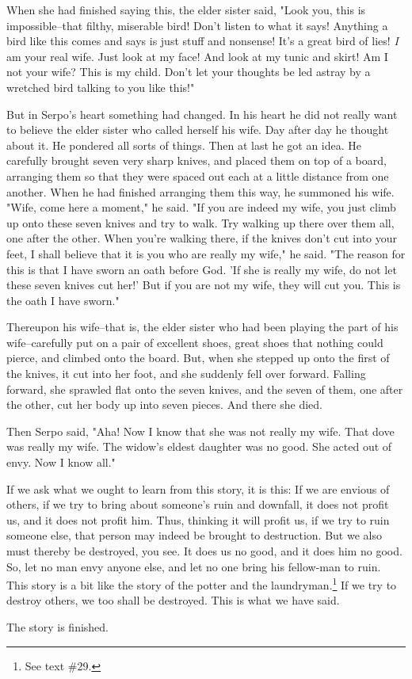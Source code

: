 When she had finished saying this, the elder sister said, "Look you, this
is impossible--that filthy, miserable bird! Don't listen to what it says! Anything
a bird like this comes and says is just stuff and nonsense! It's a great bird of
lies! \textit{I} am your real wife. Just look at my face! And look at my tunic
and skirt! Am I not your wife? This is my child. Don't let your thoughts be led
astray by a wretched bird talking to you like this!"

But in Serpo's heart something had changed. In his heart he did not really want
to believe the elder sister who called herself his wife. Day after day he thought
about it. He pondered all sorts of things. Then at last he got an idea. He carefully
brought seven very sharp knives, and placed them on top of a board, arranging them
so that they were spaced out each at a little distance from one another. When he
had finished arranging them this way, he summoned his wife. "Wife, come
here a moment," he said. "If you are indeed my wife, you just
climb up onto these seven knives and try to walk. Try walking up there over them
all, one after the other. When you're walking there, if the knives don't cut into
your feet, I shall believe that it is you who are really my wife," he
said. "The reason for this is that I have sworn an oath before God. 'If
she is really my wife, do not let these seven knives cut her!' But if you are not
my wife, they will cut you. This is the oath I have sworn."

Thereupon his wife--that is, the elder sister who had been playing the part of
his wife--carefully put on a pair of excellent shoes, great shoes that nothing
could pierce, and climbed onto the board. But, when she stepped up onto the first
of the knives, it cut into her foot, and she suddenly fell over forward. Falling
forward, she sprawled flat onto the seven knives, and the seven of them, one after
the other, cut her body up into seven pieces. And there she died.

Then Serpo said, "Aha! Now I know that she was not really my wife. That
dove was really my wife. The widow's eldest daughter was no good. She acted out
of envy. Now I know all."

If we ask what we ought to learn from this story, it is this: If we are envious
of others, if we try to bring about someone's ruin and downfall, it does not profit
us, and it does not profit him. Thus, thinking it will profit us, if we try to
ruin someone else, that person may indeed be brought to destruction. But we also
must thereby be destroyed, you see. It does us no good, and it does him no good.
So, let no man envy anyone else, and let no one bring his fellow-man to ruin. This
story is a bit like the story of the potter and the laundryman.\footnote{See text \#29.} If we try to
destroy others, we too shall be destroyed. This is what we have said.

The story is finished.

